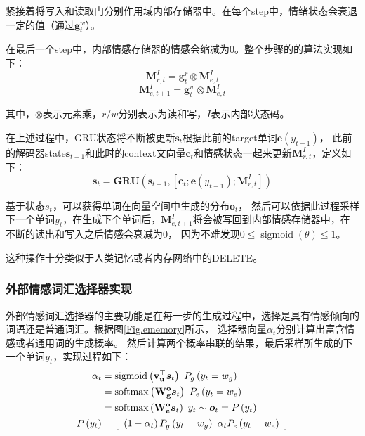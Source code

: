 \documentclass[supercite]{HustGraduPaper}
\theoremstyle{definition}
\begin{document}
紧接着将写入和读取门分别作用域内部存储器中。在每个step中，情绪状态会衰退一定的值（通过$\boldsymbol{g}_t^w$）。

在最后一个step中，内部情感存储器的情感会缩减为0。整个步骤的的算法实现如下：
$$\boldsymbol { M } _ { r , t } ^ { I } = \boldsymbol { g } _ { t } ^ { r } \otimes \boldsymbol { M } _ { e , t } ^ { I }$$
$$\boldsymbol { M } _ { e , t + 1 } ^ { I } = \boldsymbol { g } _ { t } ^ { w } \otimes \boldsymbol { M } _ { e , t } ^ { I }$$

其中，$\otimes$表示元素乘，$r/w$分别表示为读和写，$I$表示内部状态码。

在上述过程中，GRU状态将不断被更新$\boldsymbol{s}_t$根据此前的target单词$\boldsymbol{e}(y_{t-1})$，
此前的解码器state$\boldsymbol{s}_{t-1}$和此时的context文向量$\boldsymbol{c}_t$和情感状态一起来更新$\boldsymbol{M}_{r,t}^I$，定义如下：
$$\boldsymbol { s } _ { t } = \mathbf { G } \mathbf { R } \mathbf { U } \left( \boldsymbol { s } _ { t - 1 } , \left[ \boldsymbol { c } _ { t } ; \boldsymbol { e } \left( y _ { t - 1 } \right) ; \boldsymbol { M } _ { r , t } ^ { I } \right] \right)$$

基于状态$s_t$，可以获得单词在向量空间中生成的分布$\boldsymbol{o}_t$，
然后可以依据此过程采样下一个单词$y_t$，在生成下个单词后，$\boldsymbol{M}_{e,t+1}^I$将会被写回到内部情感存储器中，在不断的读出和写入之后情感会衰减为0，
因为不难发现$0 \leq \operatorname { sigmoid } ( \theta ) \leq 1$。

这种操作十分类似于人类记忆或者内存网络中的DELETE\cite{miller1956human}。

\subsubsection{外部情感词汇选择器实现}
外部情感词汇选择器的主要功能是在每一步的生成过程中，选择是具有情感倾向的词语还是普通词汇。根据图\ref{Fig.ememory}所示，
选择器向量$\alpha_t$分别计算出富含情感或者通用词的生成概率。
然后计算两个概率串联的结果，最后采样所生成的下一个单词$y_t$，实现过程如下：
\begin{align} 
  \alpha _ { t } \notag
  &= \operatorname { sigmoid } \left( \mathbf { v } _ { \mathbf { u } } ^ { \top } \boldsymbol { s } _ { t } \right) \ P _ { g } \left( y _ { t } = w _ { g } \right) \\\notag
  & = \operatorname { softmax } \left( \mathbf { W } _ { \mathbf { g } } ^ { \mathbf { o } } \boldsymbol { s } _ { t } \right) \ P _ { e } \left( y _ { t } = w _ { e } \right) \\\notag
  & = \operatorname { softmax } \left( \mathbf { W } _ { \mathbf { e } } ^ { \mathbf { o } } \boldsymbol { s } _ { t } \right) \ y _ { t } \sim \boldsymbol { o } _ { t } = P \left( y _ { t } \right) \\\notag
  P \left( y _ { t } \right) 
  &= \left[ \begin{array} { c } \left( 1 - \alpha _ { t } \right) P _ { g } \left( y _ { t } = w _ { g } \right) \ \alpha _ { t } P _ { e } \left( y _ { t } = w _ { e } \right) \end{array} \right] \notag
\end{align}
\end{document}
